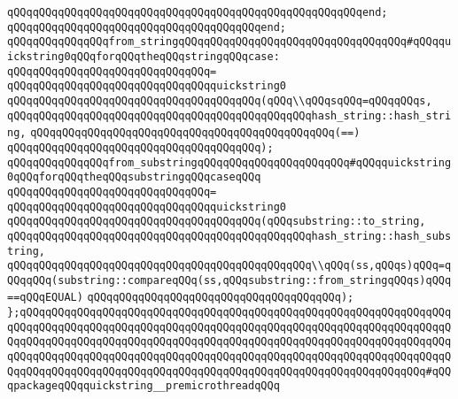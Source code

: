 \verb|qQQqqQQqqQQqqQQqqQQqqQQqqQQqqQQqqQQqqQQqqQQqqQQqqQQqqQQqend;|\newline
\verb|qQQqqQQqqQQqqQQqqQQqqQQqqQQqqQQqqQQqqQQqend;|\newline
\newline
\newline
\verb|qQQqqQQqqQQqqQQqfrom_stringqQQqqQQqqQQqqQQqqQQqqQQqqQQqqQQqqQQq#qQQqquickstring0qQQqforqQQqtheqQQqstringqQQqcase:|\newline
\verb|qQQqqQQqqQQqqQQqqQQqqQQqqQQqqQQq=|\newline
\verb|qQQqqQQqqQQqqQQqqQQqqQQqqQQqqQQqquickstring0|\newline
\verb|qQQqqQQqqQQqqQQqqQQqqQQqqQQqqQQqqQQqqQQq(qQQq\\qQQqsqQQq=qQQqqQQqs,|\newline
\verb|qQQqqQQqqQQqqQQqqQQqqQQqqQQqqQQqqQQqqQQqqQQqqQQqhash_string::hash_string,|\newline
\verb|qQQqqQQqqQQqqQQqqQQqqQQqqQQqqQQqqQQqqQQqqQQqqQQq(==)|\newline
\verb|qQQqqQQqqQQqqQQqqQQqqQQqqQQqqQQqqQQqqQQq);|\newline
\newline
\verb|qQQqqQQqqQQqqQQqfrom_substringqQQqqQQqqQQqqQQqqQQqqQQq#qQQqquickstring0qQQqforqQQqtheqQQqsubstringqQQqcaseqQQq|\newline
\verb|qQQqqQQqqQQqqQQqqQQqqQQqqQQqqQQq=|\newline
\verb|qQQqqQQqqQQqqQQqqQQqqQQqqQQqqQQqquickstring0|\newline
\verb|qQQqqQQqqQQqqQQqqQQqqQQqqQQqqQQqqQQqqQQq(qQQqsubstring::to_string,|\newline
\verb|qQQqqQQqqQQqqQQqqQQqqQQqqQQqqQQqqQQqqQQqqQQqqQQqhash_string::hash_substring,|\newline
\verb|qQQqqQQqqQQqqQQqqQQqqQQqqQQqqQQqqQQqqQQqqQQqqQQq\\qQQq(ss,qQQqs)qQQq=qQQqqQQq(substring::compareqQQq(ss,qQQqsubstring::from_stringqQQqs)qQQq==qQQqEQUAL)|\newline
\verb|qQQqqQQqqQQqqQQqqQQqqQQqqQQqqQQqqQQqqQQq);|\newline
\newline
\verb|};qQQqqQQqqQQqqQQqqQQqqQQqqQQqqQQqqQQqqQQqqQQqqQQqqQQqqQQqqQQqqQQqqQQqqQQqqQQqqQQqqQQqqQQqqQQqqQQqqQQqqQQqqQQqqQQqqQQqqQQqqQQqqQQqqQQqqQQqqQQqqQQqqQQqqQQqqQQqqQQqqQQqqQQqqQQqqQQqqQQqqQQqqQQqqQQqqQQqqQQqqQQqqQQqqQQqqQQqqQQqqQQqqQQqqQQqqQQqqQQqqQQqqQQqqQQqqQQqqQQqqQQqqQQqqQQqqQQqqQQqqQQqqQQqqQQqqQQqqQQqqQQqqQQqqQQqqQQqqQQqqQQqqQQqqQQqqQQqqQQqqQQq#qQQqpackageqQQqquickstring__premicrothreadqQQq|\newline
